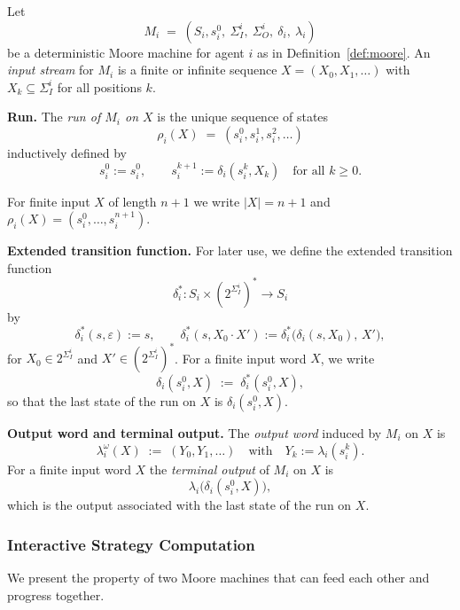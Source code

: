 \documentclass{article}
\begin{document}
  \begin{definition}
    \label{def:moore-run}
    Let 
    \[
    M_i \;=\; (S_i, s^0_i,\ \Sigma_I^i,\ \Sigma_O^i,\ \delta_i,\ \lambda_i)
    \]
    be a deterministic Moore machine for agent $i$ as in Definition~\ref{def:moore}.
    An \emph{input stream} for $M_i$ is a finite or infinite sequence 
    $X = (X_0,X_1,\dots)$ with $X_k \subseteq \Sigma_I^i$ for all positions $k$.
    
    \medskip
    \noindent\textbf{Run.}
    The \emph{run of $M_i$ on $X$} is the unique sequence of states
    \[
    \rho_i(X) \;=\; (s^0_i,s^1_i,s^2_i,\dots)
    \]
    inductively defined by
    \[
    s^{0}_i := s^0_i,
    \qquad
    s^{k+1}_i := \delta_i(s^k_i, X_k)
    \quad\text{for all }k \ge 0.
    \]
    
    \noindent For finite input $X$ of length $n{+}1$ we write $|X|=n{+}1$ and 
    $\rho_i(X) = (s^0_i,\dots,s^{n+1}_i)$.
    
    \medskip
    \noindent\textbf{Extended transition function.}
    For later use, we define the extended transition function
    \[
    \delta_i^{*} : S_i \times (2^{\Sigma_I^i})^{*} \to S_i
    \]
    by
    \[
    \delta_i^{*}(s, \varepsilon) := s,
    \qquad
    \delta_i^{*}(s, X_0\cdot X') := 
    \delta_i^{*}\bigl(\delta_i(s,X_0),\,X'\bigr),
    \]
    for $X_0 \in 2^{\Sigma_I^i}$ and $X' \in (2^{\Sigma_I^i})^{*}$.
    For a finite input word $X$, we write
    \[
    \delta_i(s^0_i,X) \;:=\; \delta_i^{*}(s^0_i,X),
    \]
    so that the last state of the run on $X$ is $\delta_i(s^0_i,X)$.
    
    \medskip
    \noindent\textbf{Output word and terminal output.}
    The \emph{output word} induced by $M_i$ on $X$ is
    \[
    \lambda_i^{\omega}(X) \;:=\; (Y_0,Y_1,\dots)
    \quad\text{with}\quad
    Y_k := \lambda_i(s^k_i).
    \]
    For a finite input word $X$ the \emph{terminal output} of $M_i$ on $X$ is
    \[
    \lambda_i\bigl(\delta_i(s^0_i,X)\bigr),
    \]
    which is the output associated with the last state of the run on $X$.
    \end{definition}
  
  \subsubsection{Interactive Strategy Computation}
  
  We present the property of two Moore machines that can feed each other and progress together.
  
\end{document}
